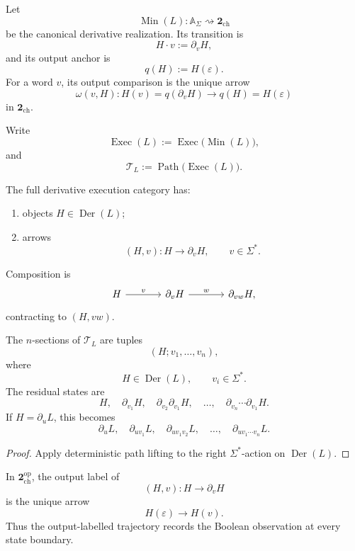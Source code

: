 Let
\[
    \operatorname{Min}(L):
    \mathbb A_\Sigma
    \rightsquigarrow
    \mathbf 2_{\mathrm{ch}}
\]
be the canonical derivative realization. Its transition is
\[
    H\cdot v:=\partial_vH,
\]
and its output anchor is
\[
    q(H):=H(\varepsilon).
\]
For a word \(v\), its output comparison is the unique arrow
\[
    \omega(v,H):
    H(v)=q(\partial_vH)
    \longrightarrow
    q(H)=H(\varepsilon)
\]
in \(\mathbf 2_{\mathrm{ch}}\).

Write
\[
    \operatorname{Exec}(L)
    :=
    \operatorname{Exec}\bigl(\operatorname{Min}(L)\bigr),
\]
and
\[
    \mathscr T_L
    :=
    \operatorname{Path}\bigl(\operatorname{Exec}(L)\bigr).
\]

The full derivative execution category has:
\begin{enumerate}
    \item objects \(H\in\operatorname{Der}(L)\);
    \item arrows
    \[
        (H,v):
        H\to\partial_vH,
        \qquad
        v\in\Sigma^\ast.
    \]
\end{enumerate}
Composition is
\[
\begin{tikzcd}[column sep=large]
    H
        \arrow[r, "v"]
    &
    \partial_vH
        \arrow[r, "w"]
    &
    \partial_{vw}H,
\end{tikzcd}
\]
contracting to \((H,vw)\).

\begin{proposition}
\label{prop:finite-word-labelled-derivative-executions}
The \(n\)-sections of \(\mathscr T_L\) are tuples
\[
    (H;v_1,\ldots,v_n),
\]
where
\[
    H\in\operatorname{Der}(L),
    \qquad
    v_i\in\Sigma^\ast.
\]
The residual states are
\[
    H,
    \quad
    \partial_{v_1}H,
    \quad
    \partial_{v_2}\partial_{v_1}H,
    \quad
    \ldots,
    \quad
    \partial_{v_n}\cdots\partial_{v_1}H.
\]
If \(H=\partial_uL\), this becomes
\[
    \partial_uL,
    \quad
    \partial_{uv_1}L,
    \quad
    \partial_{uv_1v_2}L,
    \quad
    \ldots,
    \quad
    \partial_{uv_1\cdots v_n}L.
\]
\end{proposition}

\begin{proof}
Apply deterministic path lifting to the right
\(\Sigma^\ast\)-action on \(\operatorname{Der}(L)\).
\end{proof}

In
\(\mathbf 2_{\mathrm{ch}}^{\mathrm{op}}\), the output label of
\[
    (H,v):H\to\partial_vH
\]
is the unique arrow
\[
    H(\varepsilon)\longrightarrow H(v).
\]
Thus the output-labelled trajectory records the Boolean observation at every
state boundary.

